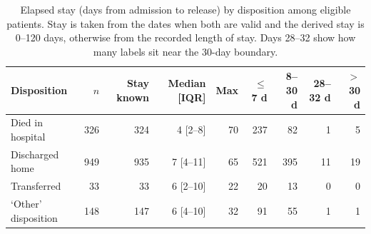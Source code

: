 \begin{table}[htbp]\centering\small
\caption{Elapsed stay (days from admission to release) by disposition among eligible patients. Stay is taken from the dates when both are valid and the derived stay is 0--120 days, otherwise from the recorded length of stay. Days 28--32 show how many labels sit near the 30-day boundary.}\label{tab:lostab}
\begin{tabular}{lrrrrrrrr}
\toprule
Disposition & $n$ & Stay known & Median [IQR] & Max & $\le$7 d & 8--30 d & 28--32 d & $>$30 d \\
\midrule
Died in hospital & 326 & 324 & 4 [2--8] & 70 & 237 & 82 & 1 & 5 \\
Discharged home & 949 & 935 & 7 [4--11] & 65 & 521 & 395 & 11 & 19 \\
Transferred & 33 & 33 & 6 [2--10] & 22 & 20 & 13 & 0 & 0 \\
`Other' disposition & 148 & 147 & 6 [4--10] & 32 & 91 & 55 & 1 & 1 \\
\bottomrule
\end{tabular}
\end{table}
